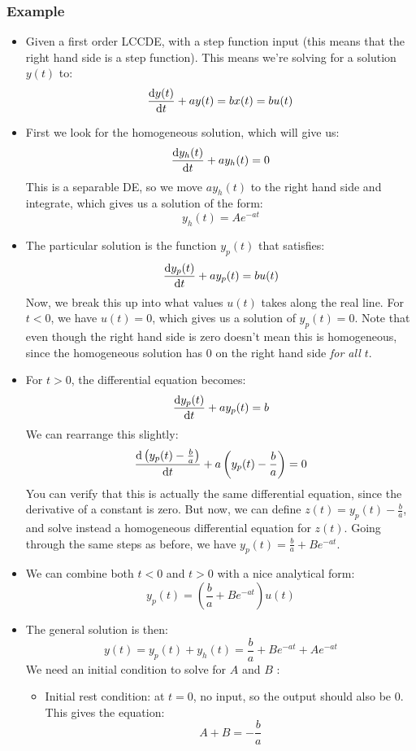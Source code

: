 \subsubsection{Example}
\begin{itemize}
	\item Given a first order LCCDE, with a step function input (this means that the right hand side is a 
		step function). This means we're solving for a solution 
		\( y(t) \) to:
		\[
			\dv{y(t)}{t} + ay(t) = bx(t) = bu(t)
		\] 
	\item First we look for the homogeneous solution, which will give us:
		\[
			\dv{y_h(t)}{t} + ay_h(t) = 0
		\] 
		This is a separable DE, so we move \( ay_h(t)  \) to the right hand side and integrate, 
		which gives us a solution of the form:
		\[
		y_h(t) = Ae^{-at}
		\] 
	\item The particular solution is the function \( y_p(t) \) that satisfies:
		\[
			\dv{y_p(t)}{t} + ay_p(t) = bu(t)
		\] 
		Now, we break this up into what values \( u(t)  \) takes along the real line. For \( t < 0 \), we have 
		\( u(t) =0\), which gives us a solution of \( y_p(t) = 0 \). Note that even though the right hand side 
		is zero doesn't mean this is homogeneous, since the homogeneous solution has 0 on the right hand side 
		\textit{for all \( t \)}.


	\item For \( t > 0 \), the differential equation becomes:
		\[
			\dv{y_p(t)}{t} + ay_p(t) = b
		\] 
		We can rearrange this slightly:
		\[
			\dv{\left( y_p(t) - \frac{b}{a} \right)}{t} + a\left( y_p(t) - \frac{b}{a} \right) = 0
		\] 
		You can verify that this is actually the same differential equation, since the derivative of a constant 
		is zero. But now, we can define \( z(t) = y_p(t) - \frac{b}{a} \), and solve instead a homogeneous differential
		equation for \( z(t) \). Going through the same steps as before, we have \( y_p(t) = \frac{b}{a} + Be^{-at} \). 
	\item We can combine both \( t < 0 \) and \( t > 0 \) with a nice analytical form:
		\[
		y_p(t) = \left( \frac{b}{a} + Be^{-at} \right) u(t)
		\] 
	\item The general solution is then:
		\[
		y(t) = y_p(t) + y_h(t) = \frac{b}{a} + Be^{-at} + Ae^{-at}
		\] 
		We need an initial condition to solve for \( A \) and \( B \) :  
		\begin{itemize}
			\item Initial rest condition: at \( t = 0 \), no input, so the output should also be 0. This 
				gives the equation:
				\[
				A + B = -\frac{b}{a}
				\]
		\end{itemize}				
\end{itemize}

